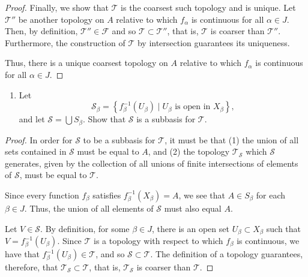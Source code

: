 \documentclass[a4paper,10pt]{article}
\newcommand{\inv}{^{-1}}
\begin{document}
\begin{solution}
\begin{proof}
        Finally, we show that $\mathcal{T}$ is the coarsest such topology and is unique.
        Let $\mathcal{T}''$ be another topology on $A$ relative to which $f_\alpha$ is continuous for all $\alpha \in J$.
        Then, by definition, $\mathcal{T}'' \in \mathcal{F}$ and so $\mathcal{T} \subset \mathcal{T}''$, that is, $\mathcal{T}$ is coarser than $\mathcal{T}''$.
        Furthermore, the construction of $\mathcal{T}$ by intersection guarantees its uniqueness.

        Thus, there is a unique coarsest topology on $A$ relative to which $f_\alpha$ is continuous for all $\alpha \in J$. 
    \end{proof}
    \bigskip

    \begin{enumerate}[label={(\alph*)}, align=left, leftmargin=\parindent, listparindent=\parindent, labelwidth=0pt, itemindent=!]
        \addtocounter{enumi}{1} 
        \item Let
        \begin{equation*}
            \mathcal{S}_\beta = \left\{f_\beta\inv(U_\beta) \mid U_\beta \text{ is open in } X_\beta\right\},
        \end{equation*}
        and let $\mathcal{S} = \bigcup S_\beta$.
        Show that $\mathcal{S}$ is a subbasis for $\mathcal{T}$.
    \end{enumerate}
    \begin{proof}
        In order for $\mathcal{S}$ to be a subbasis for $\mathcal{T}$, it must be that (1) the union of all sets contained in $\mathcal{S}$ must be equal to $A$, and (2) the topology $\mathcal{T}_\mathcal{S}$ which $\mathcal{S}$ generates, given by the collection of all unions of finite intersections of elements of $\mathcal{S}$, must be equal to $\mathcal{T}$.

        Since every function $f_\beta$ satisfies $f_\beta\inv(X_\beta) = A$, we see that $A \in S_\beta$ for each $\beta \in J$.
        Thus, the union of all elements of $\mathcal{S}$ must also equal $A$.
    
        Let $V \in \mathcal{S}$.
        By definition, for some $\beta \in J$, there is an open set $U_\beta \subset X_\beta$ such that $V = f_\beta\inv(U_\beta)$.
        Since $\mathcal{T}$ is a topology with respect to which $f_\beta$ is continuous, we have that $f_\beta\inv(U_\beta) \in \mathcal{T}$, and so $\mathcal{S} \subset \mathcal{T}$.
        The definition of a topology guarantees, therefore, that $\mathcal{T}_{\mathcal{S}} \subset \mathcal{T}$, that is, $\mathcal{T}_\mathcal{S}$ is coarser than $\mathcal{T}$.
    

\end{proof}
\end{solution}
\end{document}
